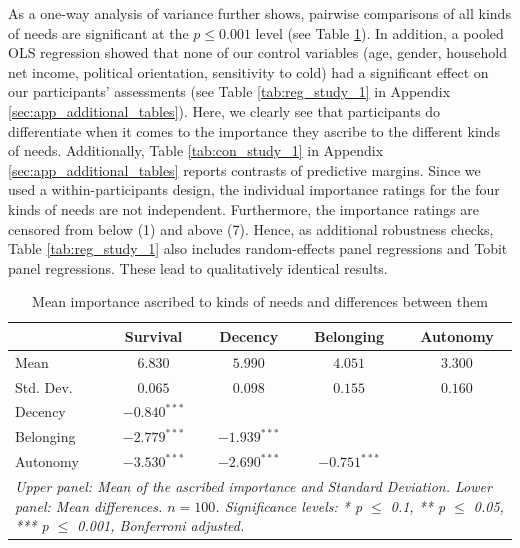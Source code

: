 \documentclass[egregdoesnotlikesansseriftitles]{scrartcl}
\begin{document}
As a one-way analysis of variance further shows, pairwise comparisons of all kinds of needs are significant at the $p \le 0.001$ level (see Table \ref{tab:study_1_anova}).
In addition, a pooled OLS regression showed that none of our control variables (age, gender, household net income, political orientation, sensitivity to cold) had a significant effect on our participants' assessments (see Table \ref{tab:reg_study_1} in Appendix \ref{sec:app_additional_tables}).
Here, we clearly see that participants do differentiate when it comes to the importance they ascribe to the different kinds of needs.
Additionally, Table \ref{tab:con_study_1} in Appendix \ref{sec:app_additional_tables} reports contrasts of predictive margins.
Since we used a within-participants design, the individual importance ratings for the four kinds of needs are not independent.
Furthermore, the importance ratings are censored from below (1) and above (7).
Hence, as additional robustness checks, Table \ref{tab:reg_study_1} also includes random-effects panel regressions and Tobit panel regressions.
These lead to qualitatively identical results.

\begin{table}[ht!]
   \centering
   \caption{Mean importance ascribed to kinds of needs and differences between them}\label{tab:study_1_anova}
   \begin{tabular}{lcccc}\\[0.5ex]
   \hline
                & Survival         & Decency          & Belonging        & Autonomy   \\
   \hline
   Mean         & $ 6.830$         & $ 5.990$         & $ 4.051$         & $3.300$    \\
   Std. Dev.    & $ 0.065$         & $ 0.098$         & $ 0.155$         & $0.160$    \\
   \hline\hline
   Decency      & $-0.840^{***}$   &                  &                  &            \\
   Belonging    & $-2.779^{***}$   & $-1.939^{***}$   &                  &            \\
   Autonomy     & $-3.530^{***}$   & $-2.690^{***}$   & $-0.751^{***}$   &            \\
   \hline
   \multicolumn{5}{p{10.5cm}}{\footnotesize{\textit{Upper panel: Mean of the ascribed importance and Standard Deviation. Lower panel: Mean differences. $n=100$. Significance levels: * p $\le$ 0.1, ** p $\le$ 0.05, *** p $\le$ 0.001, Bonferroni adjusted.}}}
   \end{tabular}
\end{table}
\end{document}
